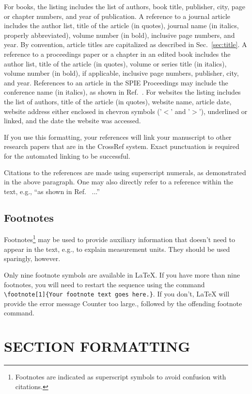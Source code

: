For books\cite{Lamport94,Alred03,Goossens97}, the listing includes the list of authors, book title, publisher, city, page or chapter numbers, and year of publication.  A reference to a journal article\cite{Metropolis53} includes the author list, title of the article (in quotes), journal name (in italics, properly abbreviated), volume number (in bold), inclusive page numbers, and year.  By convention\cite{Lamport94}, article titles are capitalized as described in Sec.~\ref{sec:title}.  A reference to a proceedings paper or a chapter in an edited book\cite{Gull89a} includes the author list, title of the article (in quotes), volume or series title (in italics), volume number (in bold), if applicable, inclusive page numbers, publisher, city, and year.  References to an article in the SPIE Proceedings may include the conference name (in italics), as shown in Ref.~. For websites\cite{Lees-Miller-LaTeX-course-1} the listing includes the list of authors, title of the article (in quotes), website name, article date, website address either enclosed in chevron symbols ('\(<\)' and '\(>\)'),  underlined or linked, and the date the website was accessed.

If you use this formatting, your references will link your manuscript to other research papers that are in the CrossRef system. Exact punctuation is required for the automated linking to be successful.

Citations to the references are made using superscript numerals, as demonstrated in the above paragraph.  One may also directly refer to a reference within the text, e.g., ``as shown in Ref.~ ...''

\subsection{Footnotes}
Footnotes\footnote{Footnotes are indicated as superscript symbols to avoid confusion with citations.} may be used to provide auxiliary information that doesn't need to appear in the text, e.g., to explain measurement units.  They should be used sparingly, however.

Only nine footnote symbols are available in LaTeX. If you have more than nine footnotes, you will need to restart the sequence using the command  \verb|\footnote[1]{Your footnote text goes here.}|. If you don't, LaTeX will provide the error message {\ttfamily Counter too large.}, followed by the offending footnote command.

\section{SECTION FORMATTING}
\label{sec:sections}

